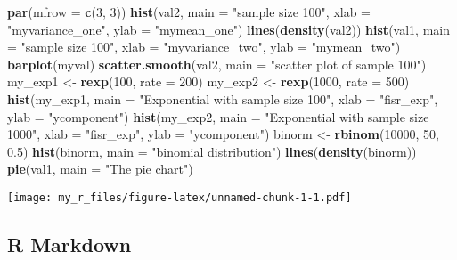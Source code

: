 \documentclass[
]{article}
\newenvironment{Shaded}{\begin{snugshade}}{\end{snugshade}}
\newcommand{\AttributeTok}[1]{\textcolor[rgb]{0.13,0.29,0.53}{#1}}
\newcommand{\DecValTok}[1]{\textcolor[rgb]{0.00,0.00,0.81}{#1}}
\newcommand{\FloatTok}[1]{\textcolor[rgb]{0.00,0.00,0.81}{#1}}
\newcommand{\FunctionTok}[1]{\textcolor[rgb]{0.13,0.29,0.53}{\textbf{#1}}}
\newcommand{\NormalTok}[1]{#1}
\newcommand{\OtherTok}[1]{\textcolor[rgb]{0.56,0.35,0.01}{#1}}
\newcommand{\StringTok}[1]{\textcolor[rgb]{0.31,0.60,0.02}{#1}}
\begin{document}
\begin{Shaded}
\begin{Highlighting}[]
\FunctionTok{par}\NormalTok{(}\AttributeTok{mfrow =} \FunctionTok{c}\NormalTok{(}\DecValTok{3}\NormalTok{, }\DecValTok{3}\NormalTok{))}
\FunctionTok{hist}\NormalTok{(val2, }\AttributeTok{main =} \StringTok{"sample size 100"}\NormalTok{, }\AttributeTok{xlab =} \StringTok{"myvariance\_one"}\NormalTok{, }\AttributeTok{ylab =} \StringTok{"mymean\_one"}\NormalTok{)}
\FunctionTok{lines}\NormalTok{(}\FunctionTok{density}\NormalTok{(val2))}
\FunctionTok{hist}\NormalTok{(val1, }\AttributeTok{main =} \StringTok{"sample size 100"}\NormalTok{, }\AttributeTok{xlab =} \StringTok{"myvariance\_two"}\NormalTok{, }\AttributeTok{ylab =} \StringTok{"mymean\_two"}\NormalTok{)}
\FunctionTok{barplot}\NormalTok{(myval)}
\FunctionTok{scatter.smooth}\NormalTok{(val2, }\AttributeTok{main =} \StringTok{"scatter plot of sample 100"}\NormalTok{)}
\NormalTok{my\_exp1 }\OtherTok{\textless{}{-}} \FunctionTok{rexp}\NormalTok{(}\DecValTok{100}\NormalTok{, }\AttributeTok{rate =} \DecValTok{200}\NormalTok{)}
\NormalTok{my\_exp2 }\OtherTok{\textless{}{-}} \FunctionTok{rexp}\NormalTok{(}\DecValTok{1000}\NormalTok{, }\AttributeTok{rate =} \DecValTok{500}\NormalTok{)}
\FunctionTok{hist}\NormalTok{(my\_exp1, }\AttributeTok{main =} \StringTok{"Exponential with sample size 100"}\NormalTok{, }\AttributeTok{xlab =} \StringTok{"fisr\_exp"}\NormalTok{, }\AttributeTok{ylab =} \StringTok{"ycomponent"}\NormalTok{)}
\FunctionTok{hist}\NormalTok{(my\_exp2, }\AttributeTok{main =} \StringTok{"Exponential with sample size 1000"}\NormalTok{, }\AttributeTok{xlab =} \StringTok{"fisr\_exp"}\NormalTok{, }\AttributeTok{ylab =} \StringTok{"ycomponent"}\NormalTok{)}
\NormalTok{binorm }\OtherTok{\textless{}{-}} \FunctionTok{rbinom}\NormalTok{(}\DecValTok{10000}\NormalTok{, }\DecValTok{50}\NormalTok{, }\FloatTok{0.5}\NormalTok{)}
\FunctionTok{hist}\NormalTok{(binorm, }\AttributeTok{main =} \StringTok{"binomial distribution"}\NormalTok{)}
\FunctionTok{lines}\NormalTok{(}\FunctionTok{density}\NormalTok{(binorm))}
\FunctionTok{pie}\NormalTok{(val1, }\AttributeTok{main =} \StringTok{"The pie chart"}\NormalTok{)}
\end{Highlighting}
\end{Shaded}

\texttt{[image: my\_r\_files/figure-latex/unnamed-chunk-1-1.pdf]}

\hypertarget{r-markdown}{%
\subsection{R Markdown}\label{r-markdown}}
\end{document}

